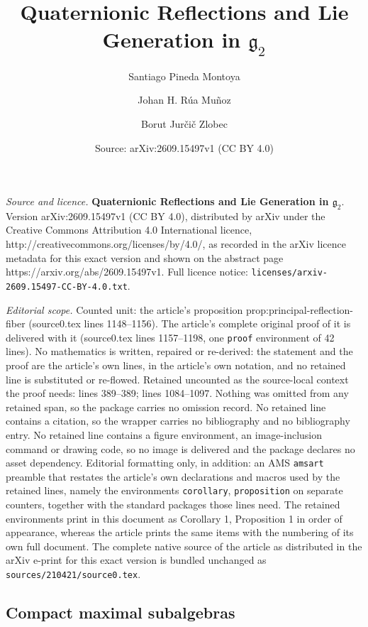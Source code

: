 \documentclass[10pt,a4paper]{amsart}
\title{\textbf{Quaternionic Reflections and Lie Generation in $\mathfrak g_2$}}
\author{Santiago Pineda Montoya \and Johan H. R\'{u}a Mu\~{n}oz \and Borut Jur\v{c}i\v{c} Zlobec}
\date{Source: arXiv:2609.15497v1 (CC BY 4.0)}
\begin{document}
\maketitle

\noindent\emph{Source and licence.} \textbf{Quaternionic Reflections and Lie Generation in $\mathfrak g_2$}. Version arXiv:2609.15497v1 (CC BY 4.0), distributed by arXiv under the Creative Commons Attribution 4.0 International licence, http://creativecommons.org/licenses/by/4.0/, as recorded in the arXiv licence metadata for this exact version and shown on the abstract page https://arxiv.org/abs/2609.15497v1. Full licence notice: \texttt{licenses/arxiv-2609.15497-CC-BY-4.0.txt}.\par\smallskip

\noindent\textit{Editorial scope.} Counted unit: the article's proposition prop:principal-reflection-fiber (source0.tex lines 1148--1156). The article's complete original proof of it is delivered with it (source0.tex lines 1157--1198, one \texttt{proof} environment of 42 lines). No mathematics is written, repaired or re-derived: the statement and the proof are the article's own lines, in the article's own notation, and no retained line is substituted or re-flowed.  Retained uncounted as the source-local context the proof needs: lines 389--389; lines 1084--1097.  Nothing was omitted from any retained span, so the package carries no omission record.  No retained line contains a citation, so the wrapper carries no bibliography and no bibliography entry.  No retained line contains a figure environment, an image-inclusion command or drawing code, so no image is delivered and the package declares no asset dependency.  Editorial formatting only, in addition: an AMS \texttt{amsart} preamble that restates the article's own declarations and macros used by the retained lines, namely the environments \texttt{corollary}, \texttt{proposition} on separate counters, together with the standard packages those lines need.  The retained environments print in this document as Corollary 1, Proposition 1 in order of appearance, whereas the article prints the same items with the numbering of its own full document.  The complete native source of the article as distributed in the arXiv e-print for this exact version is bundled unchanged as \texttt{sources/210421/source0.tex}.
\subsection{Compact maximal subalgebras}\label{subsec:compact-maximals}
\end{document}
